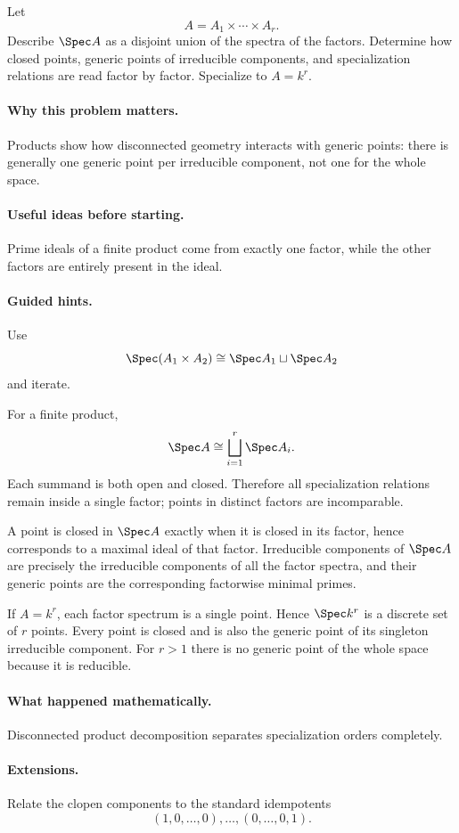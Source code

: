 \begin{problem}
Let
\[
A=A_1\times\cdots\times A_r.
\]
Describe $\Spec A$ as a disjoint union of the spectra of the factors.  Determine how closed
points, generic points of irreducible components, and specialization relations are read
factor by factor.  Specialize to $A=k^r$.
\end{problem}

\paragraph{Why this problem matters.}
Products show how disconnected geometry interacts with generic points: there is generally
one generic point per irreducible component, not one for the whole space.

\paragraph{Useful ideas before starting.}
Prime ideals of a finite product come from exactly one factor, while the other factors are
entirely present in the ideal.

\paragraph{Guided hints.}
Use
\[
\Spec(A_1\times A_2)\cong\Spec A_1\sqcup\Spec A_2
\]
and iterate.

\begin{solution}
For a finite product,
\[
\Spec A
\cong
\bigsqcup_{i=1}^r\Spec A_i.
\]
Each summand is both open and closed.  Therefore all specialization relations remain
inside a single factor; points in distinct factors are incomparable.

A point is closed in $\Spec A$ exactly when it is closed in its factor, hence corresponds
to a maximal ideal of that factor.  Irreducible components of $\Spec A$ are precisely the
irreducible components of all the factor spectra, and their generic points are the
corresponding factorwise minimal primes.

If $A=k^r$, each factor spectrum is a single point.  Hence $\Spec k^r$ is a discrete set of
$r$ points.  Every point is closed and is also the generic point of its singleton
irreducible component.  For $r>1$ there is no generic point of the whole space because it
is reducible.
\end{solution}

\paragraph{What happened mathematically.}
Disconnected product decomposition separates specialization orders completely.

\paragraph{Extensions.}
Relate the clopen components to the standard idempotents
\[
(1,0,\dots,0),\ldots,(0,\dots,0,1).
\]
